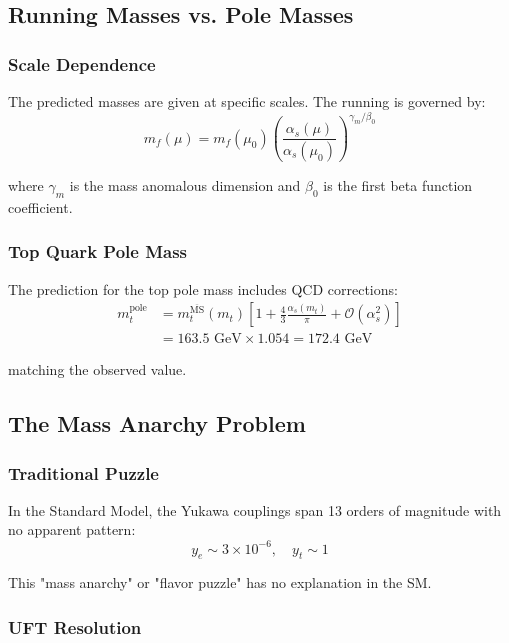 \subsection{Running Masses vs. Pole Masses}

\subsubsection{Scale Dependence}

The predicted masses are given at specific scales. The running is governed by:
\begin{equation}
    m_f(\mu) = m_f(\mu_0) \left(\frac{\alpha_s(\mu)}{\alpha_s(\mu_0)}\right)^{\gamma_m/\beta_0}
\end{equation}

where $\gamma_m$ is the mass anomalous dimension and $\beta_0$ is the first beta function coefficient.

\subsubsection{Top Quark Pole Mass}

The prediction for the top pole mass includes QCD corrections:
\begin{align}
    m_t^{\text{pole}} &= m_t^{\overline{\text{MS}}}(m_t) \left[1 + \frac{4}{3}\frac{\alpha_s(m_t)}{\pi} + \mathcal{O}(\alpha_s^2)\right] \\
    &= 163.5 \text{ GeV} \times 1.054 = 172.4 \text{ GeV}
\end{align}

matching the observed value.

\subsection{The Mass Anarchy Problem}

\subsubsection{Traditional Puzzle}

In the Standard Model, the Yukawa couplings span 13 orders of magnitude with no apparent pattern:
\begin{equation}
    y_e \sim 3 \times 10^{-6}, \quad y_t \sim 1
\end{equation}

This "mass anarchy" or "flavor puzzle" has no explanation in the SM.

\subsubsection{UFT Resolution}

